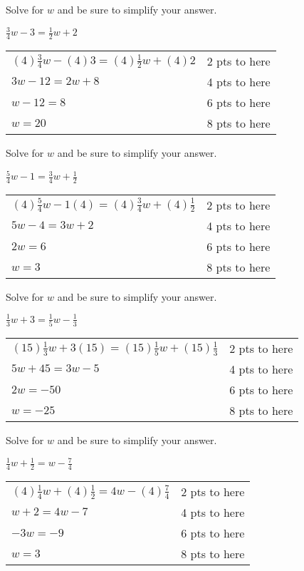 {
	Solve for $w$ and be sure to simplify your answer.
	
	$\displaystyle \frac{3}{4}w-3=\frac{1}{2}w+2$
}
{
	\begin{tabular}{l r}
	$(4)\frac{3}{4}w-(4)3=(4)\frac{1}{2}w+(4)2$ & 2 pts to here\\
	$3w-12=2w+8$ & 4 pts to here\\
	$w-12=8$ & 6 pts to here\\
	$w=20$ & 8 pts to here
	\end{tabular}
}

{
	Solve for $w$ and be sure to simplify your answer.
	
	$\displaystyle \frac{5}{4}w-1=\frac{3}{4}w +\frac{1}{2}$
}
{
	\begin{tabular}{l r}
	$(4)\frac{5}{4}w-1(4)=(4)\frac{3}{4}w +(4)\frac{1}{2}$ & 2 pts to here\\
	$5w-4=3w+2$ & 4 pts to here\\
	$2w=6$ & 6 pts to here\\
	$w=3$ & 8 pts to here
	\end{tabular}
}

{
	Solve for $w$ and be sure to simplify your answer.
	
	$\displaystyle \frac{1}{3}w+3=\frac{1}{5}w -\frac{1}{3}$
}
{
	\begin{tabular}{l r}
	$(15)\frac{1}{3}w+3(15)=(15)\frac{1}{5}w +(15)\frac{1}{3}$ & 2 pts to here\\
	$5w+45=3w-5$ & 4 pts to here\\
	$2w=-50$ & 6 pts to here\\
	$w=-25$ & 8 pts to here
	\end{tabular}
}

{
	Solve for $w$ and be sure to simplify your answer.
	
	$\displaystyle \frac{1}{4}w+\frac{1}{2}=w -\frac{7}{4}$
}
{
	\begin{tabular}{l r}
	$(4)\frac{1}{4}w+(4)\frac{1}{2}=4w -(4)\frac{7}{4}$ & 2 pts to here\\
	$w+2=4w-7$ & 4 pts to here\\
	$-3w=-9$ & 6 pts to here\\
	$w=3$ & 8 pts to here
	\end{tabular}
}
